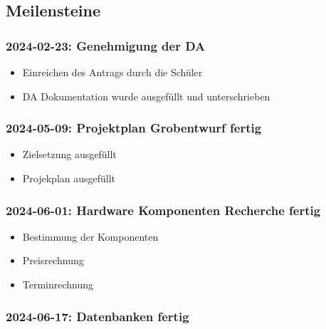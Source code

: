 \documentclass[
    headings=optiontotocandhead,%
    twoside,
    numbers=noenddot,%
    12pt, %
    titlepage, %
    parskip=full, %
    listof=leveldown, 
    numbers=noenddot, %
    a4paper,DIV=14,
    BCOR=15mm,
]{scrbook}
\providecommand{\tightlist}{%
  \setlength{\itemsep}{0pt}\setlength{\parskip}{0pt}}
\begin{document}
\hypertarget{meilensteine}{%
\subsection{Meilensteine}\label{meilensteine}}

\hypertarget{genehmigung-der-da}{%
\subsubsection{2024-02-23: Genehmigung der
DA}\label{genehmigung-der-da}}

\begin{itemize}
\tightlist
\item
  Einreichen des Antrags durch die Schüler
\item
  DA Dokumentation wurde ausgefüllt und unterschrieben
\end{itemize}

\hypertarget{projektplan-grobentwurf-fertig}{%
\subsubsection{2024-05-09: Projektplan Grobentwurf
fertig}\label{projektplan-grobentwurf-fertig}}

\begin{itemize}
\tightlist
\item
  Zielsetzung ausgefüllt
\item
  Projekplan ausgefüllt
\end{itemize}

\hypertarget{hardware-komponenten-recherche-fertig}{%
\subsubsection{2024-06-01: Hardware Komponenten Recherche
fertig}\label{hardware-komponenten-recherche-fertig}}

\begin{itemize}
\tightlist
\item
  Bestimmung der Komponenten
\item
  Preisrechnung
\item
  Terminrechnung
\end{itemize}

\hypertarget{datenbanken-fertig}{%
\subsubsection{2024-06-17: Datenbanken
fertig}\label{datenbanken-fertig}}
\end{document}
